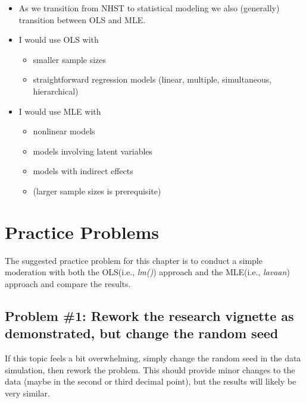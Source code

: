 \documentclass[
  11pt,
]{book}
\providecommand{\tightlist}{%
  \setlength{\itemsep}{0pt}\setlength{\parskip}{0pt}}
\begin{document}
\begin{itemize}
\tightlist
\item
  As we transition from NHST to statistical modeling we also (generally) transition between OLS and MLE.
\item
  I would use OLS with

  \begin{itemize}
  \tightlist
  \item
    smaller sample sizes
  \item
    straightforward regression models (linear, multiple, simultaneous, hierarchical)
  \end{itemize}
\item
  I would use MLE with

  \begin{itemize}
  \tightlist
  \item
    nonlinear models
  \item
    models involving latent variables
  \item
    models with indirect effects
  \item
    (larger sample sizes is prerequisite)
  \end{itemize}
\end{itemize}

\hypertarget{practice-problems-6}{%
\section{Practice Problems}\label{practice-problems-6}}

The suggested practice problem for this chapter is to conduct a simple moderation with both the OLS(i.e., \emph{lm()}) approach and the MLE(i.e., \emph{lavaan}) approach and compare the results.

\hypertarget{problem-1-rework-the-research-vignette-as-demonstrated-but-change-the-random-seed-2}{%
\subsection{Problem \#1: Rework the research vignette as demonstrated, but change the random seed}\label{problem-1-rework-the-research-vignette-as-demonstrated-but-change-the-random-seed-2}}

If this topic feels a bit overwhelming, simply change the random seed in the data simulation, then rework the problem. This should provide minor changes to the data (maybe in the second or third decimal point), but the results will likely be very similar.
\end{document}
